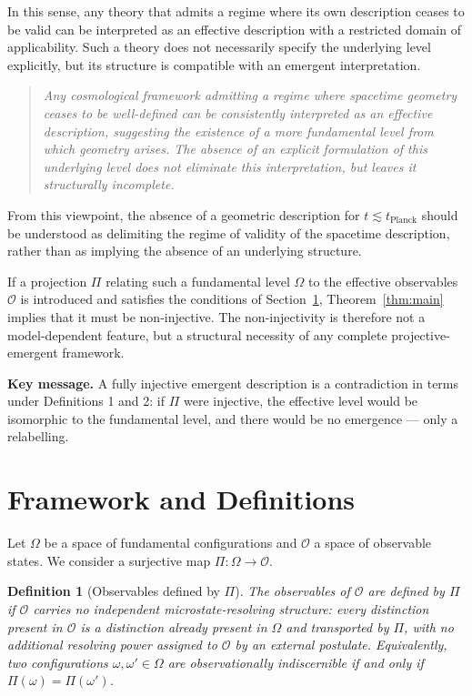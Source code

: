 \documentclass[12pt,a4paper]{article}
\newtheorem{definition}{Definition}
\begin{document}
    In this sense, any theory that admits a regime where its own description
    ceases to be valid can be interpreted as an effective description with a
    restricted domain of applicability.
    Such a theory does not necessarily specify the underlying level explicitly,
    but its structure is compatible with an emergent interpretation.

    \begin{quote}
      \emph{Any cosmological framework admitting a regime where spacetime geometry
      ceases to be well-defined can be consistently interpreted as an effective
      description, suggesting the existence of a more fundamental level from which
      geometry arises.
      The absence of an explicit formulation of this underlying level does not
      eliminate this interpretation, but leaves it structurally incomplete.}
    \end{quote}

    From this viewpoint, the absence of a geometric description for
    $t \lesssim t_\mathrm{Planck}$ should be understood as delimiting the
    regime of validity of the spacetime description, rather than as implying
    the absence of an underlying structure.

    If a projection $\Pi$ relating such a fundamental level $\Omega$ to the
    effective observables $\mathcal{O}$ is introduced and satisfies the
    conditions of Section~\ref{sec:framework}, Theorem~\ref{thm:main} implies
    that it must be non-injective.
    The non-injectivity is therefore not a model-dependent feature, but a
    structural necessity of any complete projective-emergent framework.

    \textbf{Key message.}
    A fully injective emergent description is a contradiction in terms under
    Definitions 1 and 2: if $\Pi$ were injective, the effective level would be
    isomorphic to the fundamental level, and there would be no emergence ---
    only a relabelling.

  \section{Framework and Definitions}
  \label{sec:framework}

  Let $\Omega$ be a space of fundamental configurations and $\mathcal{O}$ a
  space of observable states.
  We consider a surjective map $\Pi : \Omega \to \mathcal{O}$.

  \begin{definition}[Observables defined by $\Pi$]
    \label{def:defined-by-Pi}
    The observables of $\mathcal{O}$ are \emph{defined by $\Pi$} if
    $\mathcal{O}$ carries no independent microstate-resolving structure:
    every distinction present in $\mathcal{O}$ is a distinction already present
    in $\Omega$ and transported by $\Pi$, with no additional resolving power
    assigned to $\mathcal{O}$ by an external postulate.
    Equivalently, two configurations $\omega, \omega' \in \Omega$ are
    observationally indiscernible if and only if $\Pi(\omega) = \Pi(\omega')$.
  \end{definition}
\end{document}
